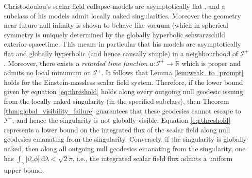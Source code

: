 \documentclass[a4paper, reqno]{amsart}
\numberwithin{equation}{section}
\theoremstyle{plain}
\theoremstyle{definition}
\theoremstyle{remark}
\newcommand{\dd}{\mathrm{d}}
\begin{document}
Christodoulou's scalar field collapse models are asymptotically flat \cite{Christodoulou:1987vv}, and a subclass of his models admit locally naked singularities. Moreover the geometry near future null infinity is shown to behave like vacuum (which in spherical symmetry is uniquely determined by the globally hyperbolic schwarzschild exterior spacetime. This means in particular that his models are asymptotically flat and globally hyperbolic (and hence causally simple) in a neighbourhood of $\mathscr{I}^+$. Moreover, there exists a \emph{retarded time function} $\mathsf u: \mathscr I^{+}\to \mathbb R$ which is proper and admits no local minumum on $\mathscr{I}^{+}$. It follows that Lemma \ref{lem:weak_to_prompt} holds for the Einstein-massless scalar field system. Therefore, if the lower bound given by equation \eqref{eq:threshold} holds along every outgoing null geodesic issuing from the locally naked singularity (in the specified subclass), then Theorem \ref{thm:global_visibility_failure} guarantees that these geodesics cannot escape to $\mathscr I^{+}$, and hence the singularity is not globally visible. Equation \eqref{eq:threshold} represents a lower bound on the integrated flux of the scalar field along null geodesics emanating from the singularity. Conversely, if the singularity is globally naked, then along all outgoing null geodesics emanating from the singularity, one has $\int_{\gamma} |\partial_v\phi|\ \dd \lambda<\sqrt{2}\pi$, i.e., the integrated scalar field flux admits a uniform upper bound.

\printbibliography
\end{document}
